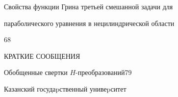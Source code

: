 

{Свойства функции Грина третьей смешанной задачи для\newline


параболического уравнения в нецилиндрической области}{68}


\bigskip





\bigskip


\par


\centerline{КРАТКИЕ СООБЩЕНИЯ}


\bigskip







{Обобщенные свертки $H$-преобразований}{79}








\vfill


\noindent\raisebox{2pt}{\copyright} Казанский госудаpственный унивеpситет





